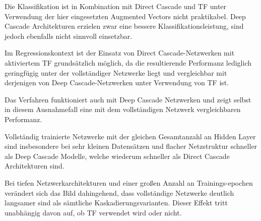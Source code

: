 Die Klassifikation ist in Kombination mit Direct Cascade und TF unter Verwendung der hier eingesetzten Augmented Vectors nicht praktikabel. 
Deep Cascade Architekturen erzielen zwar eine bessere Klassifikationsleistung, sind jedoch ebenfalls nicht sinnvoll einsetzbar.

Im Regressionskontext ist der Einsatz von Direct Cascade-Netzwerken mit aktiviertem TF grundsätzlich möglich, da die resultierende Performanz 
lediglich geringfügig unter der vollständiger Netzwerke liegt und vergleichbar mit derjenigen von Deep Cascade-Netzwerken unter Verwendung von 
TF ist.

Das Verfahren funktioniert auch mit Deep Cascade Netzwerken und zeigt selbst in diesem Ausnahmefall eine mit dem vollständigen Netzwerk 
vergleichbaren Performanz.

Vollständig trainierte Netzwerke mit der gleichen Gesamtanzahl an Hidden Layer sind insbesondere bei sehr kleinen Datensätzen und flacher 
Netzstruktur schneller als Deep Cascade Modelle, welche wiederum schneller als Direct Cascade Architekturen sind. 

Bei tiefen Netzwerkarchitekturen und einer großen Anzahl an Trainings-epochen verändert sich das Bild dahingehend, dass vollständige Netzwerke 
deutlich langsamer sind als sämtliche Kaskadierungsvarianten. Dieser Effekt tritt unabhängig davon auf, ob TF verwendet wird oder nicht.
